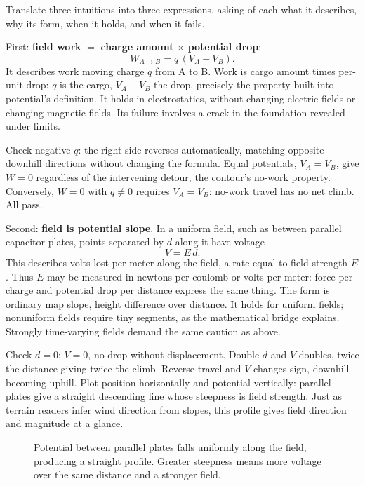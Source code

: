 \begin{mainline}
Translate three intuitions into three expressions, asking of each what it describes, why its form, when it holds, and when it fails.

First: \textbf{field work} \(=\) \textbf{charge amount} \(\times\) \textbf{potential drop}:
\[
W_{A\to B} = q\,(V_A - V_B) .
\]
It describes work moving charge \(q\) from A to B. Work is cargo amount times per-unit drop: \(q\) is the cargo, \(V_A - V_B\) the drop, precisely the property built into potential's definition. It holds in electrostatics, without changing electric fields or changing magnetic fields. Its failure involves a crack in the foundation revealed under limits.

Check negative \(q\): the right side reverses automatically, matching opposite downhill directions without changing the formula. Equal potentials, \(V_A = V_B\), give \(W=0\) regardless of the intervening detour, the contour's no-work property. Conversely, \(W=0\) with \(q\neq 0\) requires \(V_A = V_B\): no-work travel has no net climb. All pass.

Second: \textbf{field is potential slope}. In a uniform field, such as between parallel capacitor plates, points separated by \(d\) along it have voltage
\[
V = E\,d .
\]
This describes volts lost per meter along the field, a rate equal to field strength \(E\). Thus \(E\) may be measured in newtons per coulomb or volts per meter: force per charge and potential drop per distance express the same thing. The form is ordinary map slope, height difference over distance. It holds for uniform fields; nonuniform fields require tiny segments, as the mathematical bridge explains. Strongly time-varying fields demand the same caution as above.

Check \(d=0\): \(V=0\), no drop without displacement. Double \(d\) and \(V\) doubles, twice the distance giving twice the climb. Reverse travel and \(V\) changes sign, downhill becoming uphill. Plot position horizontally and potential vertically: parallel plates give a straight descending line whose steepness is field strength. Just as terrain readers infer wind direction from slopes, this profile gives field direction and magnitude at a glance.
\end{mainline}

\begin{figure}[htbp]
\centering
{}
\caption{Potential between parallel plates falls uniformly along the field, producing a straight profile. Greater steepness means more voltage over the same distance and a stronger field.}
\end{figure}

